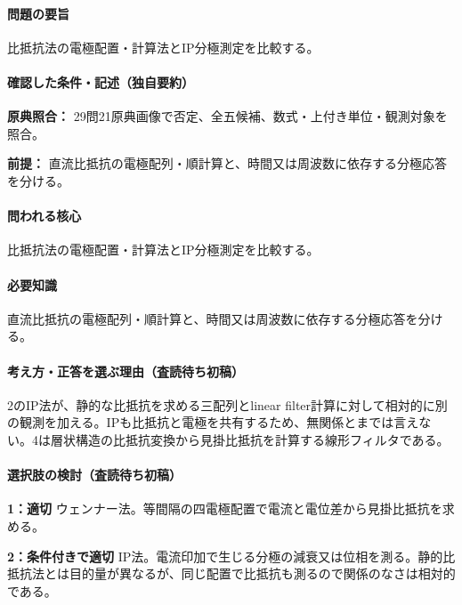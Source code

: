 \paragraph{問題の要旨} 比抵抗法の電極配置・計算法とIP分極測定を比較する。

\paragraph{確認した条件・記述（独自要約）}\mbox{}\par

\noindent\textbf{原典照合：} 29問21原典画像で否定、全五候補、数式・上付き単位・観測対象を照合。\par

\noindent\textbf{前提：} 直流比抵抗の電極配列・順計算と、時間又は周波数に依存する分極応答を分ける。\par

\paragraph{問われる核心} 比抵抗法の電極配置・計算法とIP分極測定を比較する。

\paragraph{必要知識} 直流比抵抗の電極配列・順計算と、時間又は周波数に依存する分極応答を分ける。

\paragraph{考え方・正答を選ぶ理由（査読待ち初稿）} 2のIP法が、静的な比抵抗を求める三配列とlinear filter計算に対して相対的に別の観測を加える。IPも比抵抗と電極を共有するため、無関係とまでは言えない。4は層状構造の比抵抗変換から見掛比抵抗を計算する線形フィルタである。

\paragraph{選択肢の検討（査読待ち初稿）}\mbox{}\par

\noindent\textbf{1：適切} ウェンナー法。等間隔の四電極配置で電流と電位差から見掛比抵抗を求める。\par

\noindent\textbf{2：条件付きで適切} IP法。電流印加で生じる分極の減衰又は位相を測る。静的比抵抗法とは目的量が異なるが、同じ配置で比抵抗も測るので関係のなさは相対的である。\par

